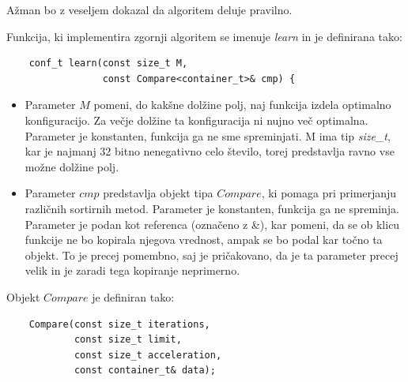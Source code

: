 \documentclass[a4paper,oneside]{article}
\begin{document}
Ažman bo z veseljem dokazal da algoritem deluje pravilno.

Funkcija, ki implementira zgornji algoritem se imenuje \emph{learn} in je definirana tako:


\begin{lstlisting}
    conf_t learn(const size_t M, 
                 const Compare<container_t>& cmp) {
\end{lstlisting}

\begin{itemize}
  \item Parameter $M$ pomeni, do kakšne dolžine polj, naj funkcija izdela optimalno
    konfiguracijo. Za večje dolžine ta konfiguracija ni nujno več optimalna. Parameter je
    konstanten, funkcija ga ne sme spreminjati. M ima tip \emph{size\_t}, kar je najmanj 32
    bitno nenegativno celo število, torej predstavlja ravno vse možne dolžine polj.
  \item Parameter $cmp$ predstavlja objekt tipa $Compare$, ki pomaga pri primerjanju
    različnih sortirnih metod. Parameter je konstanten, funkcija ga ne spreminja.
    Parameter je podan kot referenca (označeno z \&), kar pomeni, da se ob klicu funkcije
    ne bo kopirala njegova vrednost, ampak se bo podal kar točno ta objekt. To je precej
    pomembno, saj je pričakovano, da je ta parameter precej velik in je zaradi tega
    kopiranje neprimerno. 
\end{itemize}

Objekt $Compare$ je definiran tako:
\begin{lstlisting}
    Compare(const size_t iterations, 
            const size_t limit, 
            const size_t acceleration, 
            const container_t& data);
\end{lstlisting}
\end{document}
